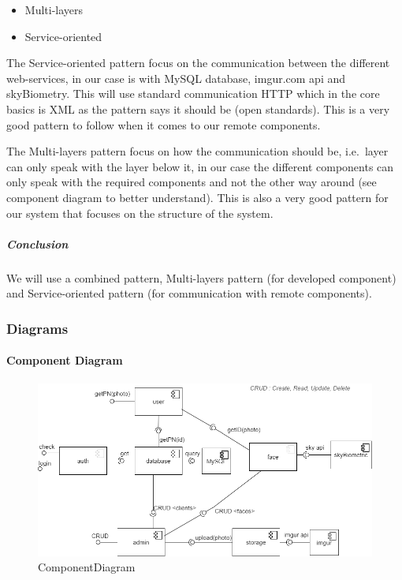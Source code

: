 \documentclass[a4paper,11pt]{article}
\begin{document}
\begin{itemize}
\item
  Multi-layers
\item
  Service-oriented
\end{itemize}

The Service-oriented pattern focus on the communication between the
different web-services, in our case is with MySQL database, imgur.com
api and skyBiometry. This will use standard communication HTTP which in
the core basics is XML as the pattern says it should be (open
standards). This is a very good pattern to follow when it comes to our
remote components.

The Multi-layers pattern focus on how the communication should be,
i.e.~layer can only speak with the layer below it, in our case the
different components can only speak with the required components and not
the other way around (see component diagram to better understand). This
is also a very good pattern for our system that focuses on the structure
of the system.

\subparagraph{Conclusion}\label{conclusion}

We will use a combined pattern, Multi-layers pattern (for developed
component) and Service-oriented pattern (for communication with remote
components).

\newpage

\subsubsection{Diagrams}\label{diagrams}

\paragraph{Component Diagram}\label{component-diagram}

\begin{figure}[ht!]
	\centering
	\includegraphics[width=150mm]{Architecture/ComponentDiagram.png}
	\caption{ComponentDiagram}
\end{figure}
\end{document}
